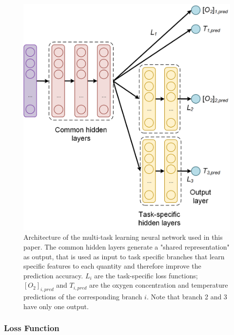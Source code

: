 \documentclass[final,5p,times,twocolumn]{elsarticle}
\begin{document}
\begin{figure}[t!]
\centering
\includegraphics[width=8.7 cm]{NN_MTL.png}
\caption{Architecture of the multi-task learning neural network used in this paper. The common hidden layers generate a "shared representation" as output, that is used as input to task specific branches that learn specific features to each quantity and therefore improve the prediction accuracy. $L_i$ are the task-specific loss functions; $[O_2]_{i,pred}$ and $T_{i,pred}$ are the oxygen concentration and temperature predictions of  the corresponding branch $i$. Note that branch 2 and 3 have only one output.} 
\label{fig:NN_MTL_O2_T}
\end{figure}


\subsubsection{Loss Function}
\end{document}
